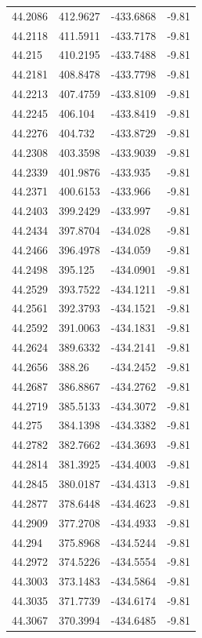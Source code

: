 \begin{table}[H]
\begin{tabular}{llll}
44.2086 & 412.9627 & -433.6868 & -9.81 \\
44.2118 & 411.5911 & -433.7178 & -9.81 \\
44.215 & 410.2195 & -433.7488 & -9.81 \\
44.2181 & 408.8478 & -433.7798 & -9.81 \\
44.2213 & 407.4759 & -433.8109 & -9.81 \\
44.2245 & 406.104 & -433.8419 & -9.81 \\
44.2276 & 404.732 & -433.8729 & -9.81 \\
44.2308 & 403.3598 & -433.9039 & -9.81 \\
44.2339 & 401.9876 & -433.935 & -9.81 \\
44.2371 & 400.6153 & -433.966 & -9.81 \\
44.2403 & 399.2429 & -433.997 & -9.81 \\
44.2434 & 397.8704 & -434.028 & -9.81 \\
44.2466 & 396.4978 & -434.059 & -9.81 \\
44.2498 & 395.125 & -434.0901 & -9.81 \\
44.2529 & 393.7522 & -434.1211 & -9.81 \\
44.2561 & 392.3793 & -434.1521 & -9.81 \\
44.2592 & 391.0063 & -434.1831 & -9.81 \\
44.2624 & 389.6332 & -434.2141 & -9.81 \\
44.2656 & 388.26 & -434.2452 & -9.81 \\
44.2687 & 386.8867 & -434.2762 & -9.81 \\
44.2719 & 385.5133 & -434.3072 & -9.81 \\
44.275 & 384.1398 & -434.3382 & -9.81 \\
44.2782 & 382.7662 & -434.3693 & -9.81 \\
44.2814 & 381.3925 & -434.4003 & -9.81 \\
44.2845 & 380.0187 & -434.4313 & -9.81 \\
44.2877 & 378.6448 & -434.4623 & -9.81 \\
44.2909 & 377.2708 & -434.4933 & -9.81 \\
44.294 & 375.8968 & -434.5244 & -9.81 \\
44.2972 & 374.5226 & -434.5554 & -9.81 \\
44.3003 & 373.1483 & -434.5864 & -9.81 \\
44.3035 & 371.7739 & -434.6174 & -9.81 \\
44.3067 & 370.3994 & -434.6485 & -9.81 \\

\end{tabular}
\end{table}
